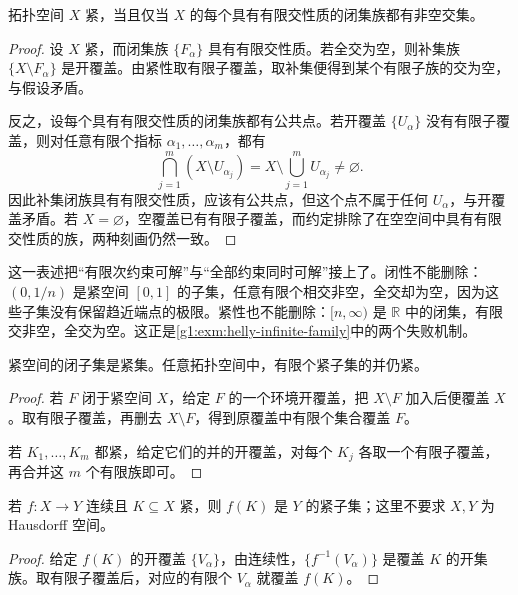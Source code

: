 \begin{theorem}\label{g1:thm:compact-fip}
	拓扑空间 \(X\) 紧，当且仅当 \(X\) 的每个具有有限交性质的闭集族都有非空交集。
\end{theorem}
\begin{proof}
	设 \(X\) 紧，而闭集族 \(\{F_\alpha\}\) 具有有限交性质。若全交为空，则补集族 \(\{X\setminus F_\alpha\}\) 是开覆盖。由紧性取有限子覆盖，取补集便得到某个有限子族的交为空，与假设矛盾。

	反之，设每个具有有限交性质的闭集族都有公共点。若开覆盖 \(\{U_\alpha\}\) 没有有限子覆盖，则对任意有限个指标 \(\alpha_1,\ldots,\alpha_m\)，都有
	\[
		\bigcap_{j=1}^m(X\setminus U_{\alpha_j})
		=X\setminus\bigcup_{j=1}^mU_{\alpha_j}\ne\varnothing.
	\]
	因此补集闭族具有有限交性质，应该有公共点，但这个点不属于任何 \(U_\alpha\)，与开覆盖矛盾。若 \(X=\varnothing\)，空覆盖已有有限子覆盖，而约定排除了在空空间中具有有限交性质的族，两种刻画仍然一致。
\end{proof}

这一表述把“有限次约束可解”与“全部约束同时可解”接上了。闭性不能删除：\((0,1/n)\) 是紧空间 \([0,1]\) 的子集，任意有限个相交非空，全交却为空，因为这些子集没有保留趋近端点的极限。紧性也不能删除：\([n,\infty)\) 是 \(\mathbb R\) 中的闭集，有限交非空，全交为空。这正是\cref{g1:exm:helly-infinite-family}中的两个失败机制。

\begin{proposition}\label{g1:prop:compact-closed-subset}
	紧空间的闭子集是紧集。任意拓扑空间中，有限个紧子集的并仍紧。
\end{proposition}
\begin{proof}
	若 \(F\) 闭于紧空间 \(X\)，给定 \(F\) 的一个环境开覆盖，把 \(X\setminus F\) 加入后便覆盖 \(X\)。取有限子覆盖，再删去 \(X\setminus F\)，得到原覆盖中有限个集合覆盖 \(F\)。

	若 \(K_1,\ldots,K_m\) 都紧，给定它们的并的开覆盖，对每个 \(K_j\) 各取一个有限子覆盖，再合并这 \(m\) 个有限族即可。
\end{proof}

\begin{proposition}\label{g1:prop:compact-image}
	若 \(f:X\to Y\) 连续且 \(K\subseteq X\) 紧，则 \(f(K)\) 是 \(Y\) 的紧子集；这里不要求 \(X,Y\) 为 Hausdorff 空间。
\end{proposition}
\begin{proof}
	给定 \(f(K)\) 的开覆盖 \(\{V_\alpha\}\)，由连续性，\(\{f^{-1}(V_\alpha)\}\) 是覆盖 \(K\) 的开集族。取有限子覆盖后，对应的有限个 \(V_\alpha\) 就覆盖 \(f(K)\)。
\end{proof}

